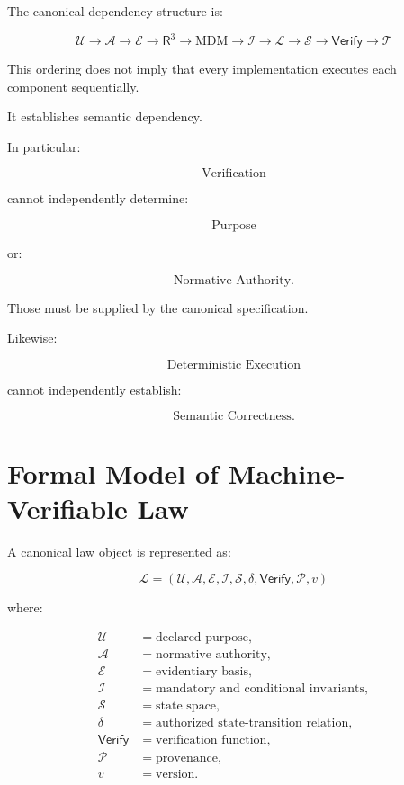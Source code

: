 \documentclass[11pt]{article}
\newcommand{\Rthree}{\ensuremath{\mathsf{R}^{3}}}
\newcommand{\MDM}{\ensuremath{\mathrm{MDM}}}
\newcommand{\Purpose}{\mathcal{U}}
\newcommand{\Authority}{\mathcal{A}}
\newcommand{\Evidence}{\mathcal{E}}
\newcommand{\Inv}{\mathcal{I}}
\newcommand{\State}{\mathcal{S}}
\newcommand{\Law}{\mathcal{L}}
\newcommand{\Prov}{\mathcal{P}}
\newcommand{\Truth}{\mathcal{T}}
\newcommand{\Verify}{\mathsf{Verify}}
\begin{document}
The canonical dependency structure is:

\[
\boxed{
\Purpose
\rightarrow
\Authority
\rightarrow
\Evidence
\rightarrow
\Rthree
\rightarrow
\MDM
\rightarrow
\Inv
\rightarrow
\Law
\rightarrow
\State
\rightarrow
\Verify
\rightarrow
\Truth
}
\]

This ordering does not imply that every implementation executes
each component sequentially.

It establishes semantic dependency.

In particular:

\[
\text{Verification}
\]

cannot independently determine:

\[
\text{Purpose}
\]

or:

\[
\text{Normative Authority}.
\]

Those must be supplied by the canonical specification.

Likewise:

\[
\text{Deterministic Execution}
\]

cannot independently establish:

\[
\text{Semantic Correctness}.
\]

\section{Formal Model of Machine-Verifiable Law}

A canonical law object is represented as:

\[
\boxed{
\Law =
(
\Purpose,
\Authority,
\Evidence,
\Inv,
\State,
\delta,
\Verify,
\Prov,
v
)
}
\]

where:

\begin{align*}
\Purpose &= \text{declared purpose},\\
\Authority &= \text{normative authority},\\
\Evidence &= \text{evidentiary basis},\\
\Inv &= \text{mandatory and conditional invariants},\\
\State &= \text{state space},\\
\delta &= \text{authorized state-transition relation},\\
\Verify &= \text{verification function},\\
\Prov &= \text{provenance},\\
v &= \text{version}.
\end{align*}
\end{document}
